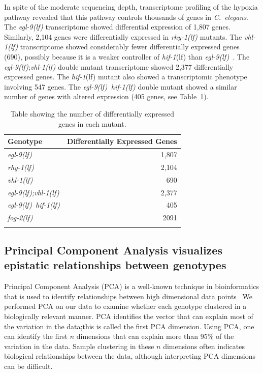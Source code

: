 \documentclass[9pt,twocolumn,twoside]{pnas-new}
\newcommand{\cel}{\emph{C.~elegans}}
\newcommand{\fog}{\emph{\mbox{fog-2(lf)}}}
\newcommand{\egl}{\emph{\mbox{egl-9}(lf)}}
\newcommand{\rhy}{\emph{\mbox{rhy-1}(lf)}}
\newcommand{\vhl}{\emph{\mbox{vhl-1}(lf)}}
\newcommand{\eglvhl}{\emph{\mbox{egl-9(lf);vhl-1(lf)}}}
\newcommand{\eglhif}{\emph{\mbox{egl-9(lf)}~\mbox{hif-1(lf)}}}
\newcommand{\hif}{\emph{\mbox{hif-1}}(lf)}
\newcommand{\egln}{1,807}
\newcommand{\rhyn}{2,104}
\newcommand{\vhln}{690}
\newcommand{\eglvhln}{2,377}
\newcommand{\hifn}{547}
\newcommand{\eglhifn}{405}
\newcommand{\fogn}{2091}
\begin{document}
In spite of the moderate sequencing depth, transcriptome profiling of the hypoxia
pathway revealed that this pathway controls thousands of genes in \cel{}. The
\egl{} transcriptome showed differential expression of \egln{} genes. Similarly,
\rhyn{} genes were differentially expressed in \rhy{} mutants. The \vhl{}
transcriptome showed considerably fewer differentially expressed genes (\vhln{}),
possibly because it is a weaker controller of \hif{} than
\egl{}~\cite{Shao2009}. The \egl{};\vhl{} double mutant transcriptome showed
\eglvhln{} differentially expressed genes. The \hif{} mutant also showed a
transcriptomic phenotype involving \hifn{} genes. The \eglhif{} double mutant
showed a similar number of genes with altered expression (\eglhifn{} genes, see
Table~\ref{tab:genes}).

\begin{table}
  \centering
  \begin{tabular}{lr}
    \toprule{}
    Genotype & Differentially Expressed Genes \\
    \midrule{}
    \egl{} & \egln{}\\
    \rhy{} & \rhyn{}\\
    \vhl{} & \vhln{}\\
    \eglvhl{} & \eglvhln{}\\
    \eglhif{} & \eglhifn{}\\
    \fog{} & \fogn{}\\
    \bottomrule{}
  \end{tabular}
  \caption{Table showing the number of differentially expressed genes in each
  mutant.}
\label{tab:genes}
\end{table}

\subsection*{Principal Component Analysis visualizes epistatic relationships between genotypes}
\label{sub:Clustering}

Principal Component Analysis (PCA) is a well-known technique in bioinformatics that is
used to identify relationships between high dimensional data points~\cite{Yeung2001}
We performed PCA on our data to examine whether each genotype clustered in a biologically
relevant manner. PCA identifies the vector that can explain most of the variation
in the data;this is called the first PCA dimension. Using PCA, one can identify
the first $n$ dimensions that can explain more than 95\% of the variation in the
data. Sample clustering in these $n$ dimensions often indicates biological
relationships between the data, although interpreting PCA dimensions can be
difficult.
\end{document}
